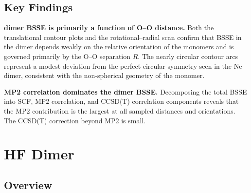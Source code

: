 \clearpage

\subsection{Key Findings}

\begin{finding_box}
\textbf{ dimer BSSE is primarily a function of O--O distance.}
Both the translational contour plots and the rotational--radial scan
confirm that BSSE in the  dimer depends weakly on the relative
orientation of the monomers and is governed primarily by the O--O
separation $R$. The nearly circular contour arcs represent a modest
deviation from the perfect circular symmetry seen in the Ne dimer,
consistent with the non-spherical geometry of the  monomer.
\end{finding_box}

\begin{finding_box}
\textbf{MP2 correlation dominates the  dimer BSSE.}
Decomposing the total BSSE into SCF, MP2 correlation, and CCSD(T)
correlation components reveals that the MP2 contribution is the
largest at all sampled distances and orientations. The CCSD(T)
correction beyond MP2 is small.
\end{finding_box}

\clearpage

\section{HF Dimer}

\subsection{Overview}

